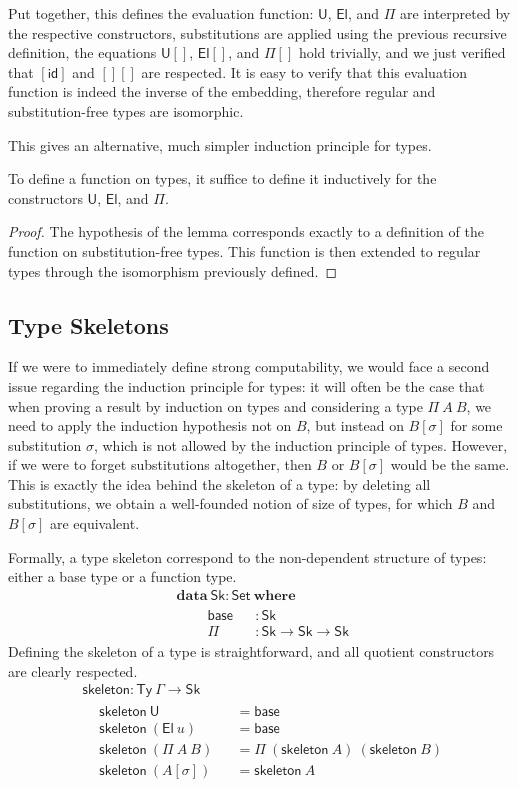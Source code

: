 \documentclass[a4paper,english]{lipics-v2019}
\newcommand{\agdaSymb}[1]{\mathsf{#1}}
\newcommand{\agdaKW}[1]{\mathbf{#1}}
\newcommand{\ind}{\hspace{1em}}
\newcommand{\data}{\agdaKW{data}}
\newcommand{\where}{\agdaKW{where}}
\newcommand{\Set}{\agdaSymb{Set}}
\newcommand{\Ty}{\agdaSymb{Ty}}
\newcommand{\id}{\agdaSymb{id}}
\newcommand{\U}{\agdaSymb{U}}
\newcommand{\El}{\agdaSymb{El}}
\newcommand{\Sk}{\agdaSymb{Sk}}
\newcommand{\base}{\agdaSymb{base}}
\newcommand{\skel}{\agdaSymb{skeleton}}
\begin{document}
Put together, this defines the evaluation function: $\U$, $\El$, and $\Pi$ are
interpreted by the respective constructors, substitutions are applied using the
previous recursive definition, the equations $\U[]$, $\El[]$, and $\Pi[]$ hold
trivially, and we just verified that $[\id]$ and $[][]$ are respected.
It is easy to verify that this evaluation function is indeed the inverse of
the embedding, therefore regular and substitution-free types are isomorphic.

This gives an alternative, much simpler induction principle for types.
\begin{lemma}
  \label{lem:typeInduction}
  To define a function on types, it suffice to define it inductively for the
  constructors $\U$, $\El$, and $\Pi$.
\end{lemma}
\begin{proof}
  The hypothesis of the lemma corresponds exactly to a definition of the
  function on substitution-free types. This function is then extended to regular
  types through the isomorphism previously defined.
\end{proof}

\subsection{Type Skeletons}
If we were to immediately define strong computability, we would face a second
issue regarding the induction principle for types: it will often be the case
that when proving a result by induction on types and considering a type
$\Pi\ A\ B$, we need to apply the induction hypothesis not on $B$, but instead
on $B[\sigma]$ for some substitution $\sigma$, which is not allowed by the
induction principle of types. However, if we were to forget substitutions
altogether, then $B$ or $B[\sigma]$ would be the same. This is exactly the idea
behind the skeleton of a type: by deleting all substitutions, we obtain a
well-founded notion of size of types, for which $B$ and $B[\sigma]$ are equivalent.

Formally, a type skeleton correspond to the non-dependent structure of types:
either a base type or a function type.
\begin{align*}
  & \data\ \Sk : \Set\ \where \\ & \ind
  \begin{alignedat}{2}
    & \base && : \Sk \\
    & \Pi && : \Sk \to \Sk \to \Sk
  \end{alignedat}
\end{align*}
Defining the skeleton of a type is straightforward, and all quotient
constructors are clearly respected.
\begin{align*}
  & \skel : \Ty\ \Gamma \to \Sk \\ &
  \begin{alignedat}{2}
    & \skel\ \U && = \base \\
    & \skel\ (\El\ u) && = \base \\
    & \skel\ (\Pi\ A\ B) && = \Pi\ (\skel\ A)\ (\skel\ B) \\
    & \skel\ (A[\sigma]) && = \skel\ A
  \end{alignedat}
\end{align*}
\end{document}
